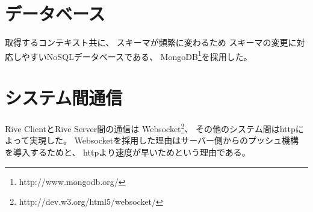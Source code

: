 \section{データベース}
取得するコンテキスト共に、
スキーマが頻繁に変わるため
スキーマの変更に対応しやすいNoSQLデータベースである、
MongoDB\footnote{http://www.mongodb.org/}を採用した。

\section{システム間通信}
Rive ClientとRive Server間の通信は
Websocket\footnote{http://dev.w3.org/html5/websocket/}、
その他のシステム間はhttpによって実現した。
Websocketを採用した理由はサーバー側からのプッシュ機構
を導入するためと、
httpより速度が早いためという理由である\cite{websocket}。
